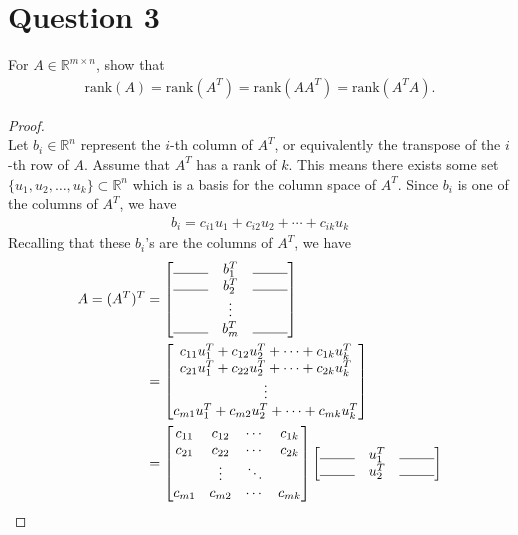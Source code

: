 \documentclass[10pt,a4paper]{article}
\theoremstyle{definition}
\theoremstyle{definition}
\numberwithin{equation}{section}
\begin{document}
\section*{Question 3}
For $A \in \mathbb{R}^{m \times n}$, show that
\begin{align*}
\text{rank}(A) = \text{rank}(A^T) = \text{rank}(AA^T) = \text{rank}(A^T A).
\end{align*}

\begin{proof}$ $
\\Let $b_i \in \mathbb{R}^n$ represent the $i$-th column of $A^T$, or equivalently the transpose of the $i$-th row of $A$. Assume that $A^T$ has a rank of $k$. This means there exists some set $\{u_1, u_2, \ldots, u_k\} \subset \mathbb{R}^n$ which is a basis for the column space of $A^T$. Since $b_i$ is one of the columns of $A^T$, we have
\begin{align*}
b_i = c_{i1}u_1 + c_{i2}u_2 + \cdots + c_{ik}u_k
\end{align*}
Recalling that these $b_i$'s are the columns of $A^T$, we have
\begin{align*}
A = (A^T)^T &= \begin{bmatrix}
\line(1,0){25} & b_1^T & \line(1,0){25}\\
\line(1,0){25} & b_2^T & \line(1,0){25}\\
& \vdots\\
\line(1,0){25} & b_m^T & \line(1,0){25}
\end{bmatrix}\\
&= \begin{bmatrix}
c_{11}u_1^T + c_{12}u_2^T + \cdots + c_{1k}u_k^T\\
c_{21}u_1^T + c_{22}u_2^T + \cdots + c_{2k}u_k^T\\
\vdots\\
c_{m1}u_1^T + c_{m2}u_2^T + \cdots + c_{mk}u_k^T
\end{bmatrix}\\
&= \begin{bmatrix}
c_{11} & c_{12} & \cdots & c_{1k}\\
c_{21} & c_{22} & \cdots & c_{2k}\\
& \vdots & \ddots\\
c_{m1} & c_{m2} & \cdots & c_{mk}
\end{bmatrix} \begin{bmatrix}
\line(1,0){25} & u_1^T & \line(1,0){25}\\
\line(1,0){25} & u_2^T & \line(1,0){25}\\

\end{bmatrix}
\end{align*}
\end{proof}
\end{document}
